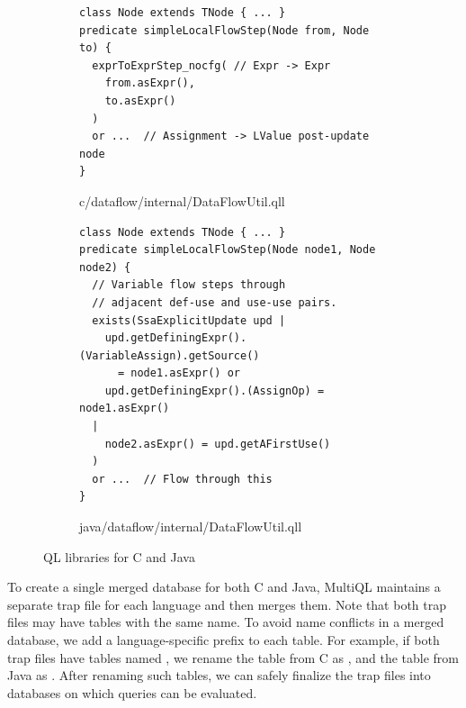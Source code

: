 \begin{figure}[t]
  \centering
  \vspace{2mm}
  \begin{subfigure}[t]{0.5\textwidth}
\begin{lstlisting}[style=codeql,xleftmargin=2.5em]
class Node extends TNode { ... }
predicate simpleLocalFlowStep(Node from, Node to) {
  exprToExprStep_nocfg( // Expr -> Expr
    from.asExpr(),
    to.asExpr()
  )
  or ...  // Assignment -> LValue post-update node
}
\end{lstlisting}
    \vspace*{-.5em}
    \caption{c/dataflow/internal/DataFlowUtil.qll}
  \end{subfigure}
  \begin{subfigure}[t]{0.5\textwidth}
\begin{lstlisting}[style=codeql,xleftmargin=2.5em]
class Node extends TNode { ... }
predicate simpleLocalFlowStep(Node node1, Node node2) {
  // Variable flow steps through
  // adjacent def-use and use-use pairs.
  exists(SsaExplicitUpdate upd |
    upd.getDefiningExpr().(VariableAssign).getSource()
      = node1.asExpr() or
    upd.getDefiningExpr().(AssignOp) = node1.asExpr()
  |
    node2.asExpr() = upd.getAFirstUse()
  )
  or ...  // Flow through this
}
\end{lstlisting}
    \vspace*{-.5em}
    \caption{java/dataflow/internal/DataFlowUtil.qll}
  \end{subfigure}
  \vspace*{-.5em}
  \caption{QL libraries for C and Java}
  \label{fig:qll}
\end{figure}

To create a single merged database for both C and Java, MultiQL maintains a
separate trap file for each language and then merges them.  
Note that both trap files may have tables with the same name.  
To avoid name conflicts in a merged database, we add a language-specific prefix
to each table.  
For example, if both trap files have tables named , we rename
the table from C as , and the table from Java as
.
After renaming such tables, we can safely finalize the trap files into
databases on which queries can be evaluated.


